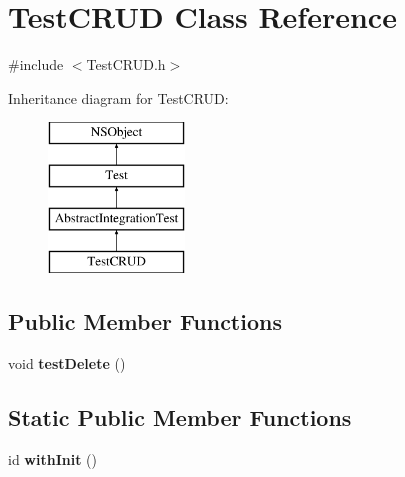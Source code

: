 \hypertarget{interface_test_c_r_u_d}{
\section{\-Test\-C\-R\-U\-D \-Class \-Reference}
\label{interface_test_c_r_u_d}
}


{\ttfamily \#include $<$\-Test\-C\-R\-U\-D.\-h$>$}

\-Inheritance diagram for \-Test\-C\-R\-U\-D\-:\begin{figure}[H]
\begin{center}
\leavevmode
\includegraphics[height=4.000000cm]{interface_test_c_r_u_d}
\end{center}
\end{figure}
\subsection*{\-Public \-Member \-Functions}
\begin{DoxyCompactItemize}
\item 
\hypertarget{interface_test_c_r_u_d_ac2354eca454cb0ff32180edf88282af1}{
void {\bfseries test\-Delete} ()}
\label{interface_test_c_r_u_d_ac2354eca454cb0ff32180edf88282af1}

\end{DoxyCompactItemize}
\subsection*{\-Static \-Public \-Member \-Functions}
\begin{DoxyCompactItemize}
\item 
\hypertarget{interface_test_c_r_u_d_a10d4c707c8fcc0bb6f1450169b3e4601}{
id {\bfseries with\-Init} ()}
\label{interface_test_c_r_u_d_a10d4c707c8fcc0bb6f1450169b3e4601}

\end{DoxyCompactItemize}


